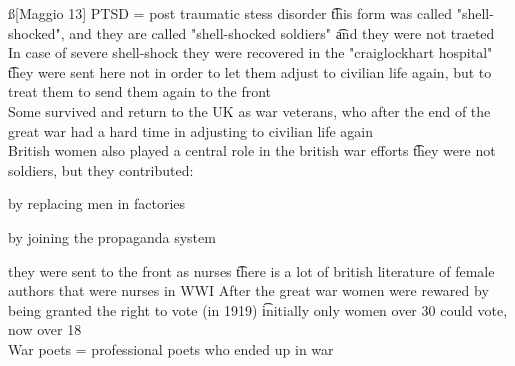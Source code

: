 \documentclass[12pt]{article}
\begin{document}
\ss[Maggio 13]
PTSD = post traumatic stess disorder \t this form was called "shell-shocked", and they are called "shell-shocked soldiers" \t and they were not traeted \\
In case of severe shell-shock they were recovered in the "craiglockhart hospital" \t they were sent here not in order to let them adjust to civilian life again, but to treat them to send them again to the front \\
Some survived and return to the UK as war veterans, who after the end of the great war had a hard time in adjusting to civilian life again \\
British women also played a central role in the british war efforts \t they were not soldiers, but they contributed:
\bi
  \item by replacing men in factories
  \item by joining the propaganda system
  \item they were sent to the front as nurses \t there is a lot of british literature of female authors that were nurses in WWI
\ei
After the great war women were rewared by being granted the right to vote (in 1919) \t initially only women over 30 could vote, now over 18 \\
War poets = professional poets who ended up in war
\end{document}
